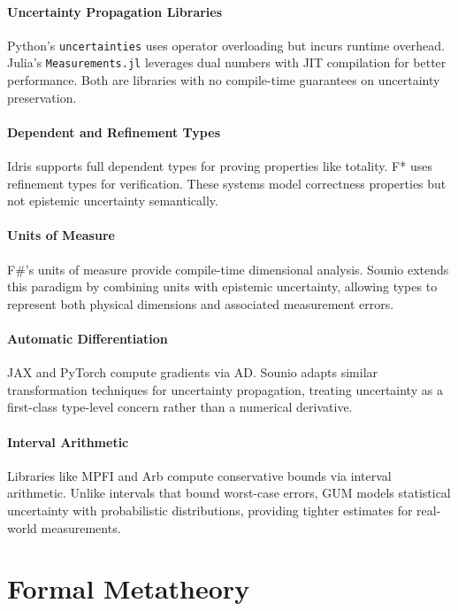 \documentclass[11pt,a4paper]{article}
\begin{document}
\paragraph{Uncertainty Propagation Libraries}
Python's \texttt{uncertainties} \citep{lebigot2024uncertainties} uses operator
overloading but incurs runtime overhead. Julia's \texttt{Measurements.jl}
\citep{giordano2016measurements} leverages dual numbers with JIT compilation
for better performance. Both are libraries with no compile-time guarantees
on uncertainty preservation.

\paragraph{Dependent and Refinement Types}
Idris \citep{brady2013idris} supports full dependent types for proving
properties like totality. F* \citep{swamy2016dependent} uses refinement
types for verification. These systems model correctness properties but
not epistemic uncertainty semantically.

\paragraph{Units of Measure}
F\#'s units of measure \citep{kennedy2009units} provide compile-time
dimensional analysis. Sounio extends this paradigm by combining units
with epistemic uncertainty, allowing types to represent both physical
dimensions and associated measurement errors.

\paragraph{Automatic Differentiation}
JAX \citep{bradbury2018jax} and PyTorch \citep{paszke2019pytorch} compute
gradients via AD. Sounio adapts similar transformation techniques for
uncertainty propagation, treating uncertainty as a first-class type-level
concern rather than a numerical derivative.

\paragraph{Interval Arithmetic}
Libraries like MPFI and Arb compute conservative bounds via interval
arithmetic. Unlike intervals that bound worst-case errors, GUM models
statistical uncertainty with probabilistic distributions, providing
tighter estimates for real-world measurements.

\section{Formal Metatheory}
\label{sec:formalization-ref}
\end{document}
